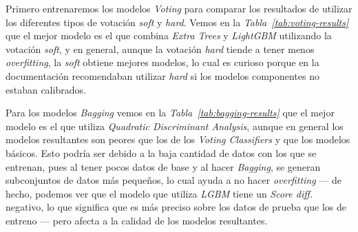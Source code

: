 Primero entrenaremos los modelos \textit{Voting} para comparar los resultados de utilizar los diferentes tipos de votación \textit{soft} y \textit{hard}. Vemos en la \textit{Tabla\ \ref{tab:voting-results}} que el mejor modelo es el que combina \textit{Extra Trees} y \textit{LightGBM} utilizando la votación \textit{soft}, y en general, aunque la votación \textit{hard} tiende a tener menos \textit{overfitting}, la \textit{soft} obtiene mejores modelos, lo cual es curioso porque en la documentación \cite{Ensemble96:online} recomendaban utilizar \textit{hard} si los modelos componentes no estaban calibrados.

Para los modelos \textit{Bagging} vemos en la \textit{Tabla\ \ref{tab:bagging-results}} que el mejor modelo es el que utiliza \textit{Quadratic Discriminant Analysis}, aunque en general los modelos resultantes son peores que los de los \textit{Voting Classifiers} y que los modelos básicos. Esto podría ser debido a la baja cantidad de datos con los que se entrenan, pues al tener pocos datos de base y al hacer \textit{Bagging}, se generan subconjuntos de datos más pequeños, lo cual ayuda a no hacer \textit{overfitting} --- de hecho, podemos ver que el modelo que utiliza \textit{LGBM} tiene un \textit{Score diff.} negativo, lo que significa que es más preciso sobre los datos de prueba que los de entreno --- pero afecta a la calidad de los modelos resultantes.

\begin{table}[!h]
    \centering
    \caption{Comparación de los resultados de entrenar los diferentes \textit{Voting Classifiers} sobre el \textit{dataset} balanceado utilizando los diferentes tipos de votación. Fuente propia.}\ \label{tab:voting-results}
\end{table}

